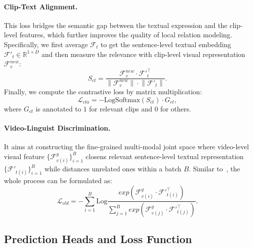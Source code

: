 \paragraph{Clip-Text Alignment.} This loss bridges the semantic gap between the textual expression and the clip-level features, which further improves the quality of local relation modeling. Specifically, we first average $\mathcal{F}_t$ to get the sentence-level textual embedding $\mathcal{F'}_t \in \mathbb{R}^{1 \times D}$ and then measure the relevance with clip-level visual representation $\mathcal{F}_v^{new}$:
\begin{equation}
    S_{ct} = \frac{\mathcal{F}_v^{new}\cdot \mathcal{F'}_t^{\top } }{\left \| \mathcal{F}_v^{new} \right \|\cdot \left \|  \mathcal{F'}_t \right \| }. 
\label{cta}
\end{equation}
Finally, we compute the contrastive loss by matrix multiplication:
\begin{equation}
    \mathcal{L}_{cta} = -\mathrm{LogSoftmax}\left(S_{ct}\right)\cdot G_{ct},
\label{cta_loss}
\end{equation}
where $G_{ct}$ is annotated to $1$ for relevant clips and $0$ for others.
\paragraph{Video-Linguist Discrimination.} It aims at constructing the fine-grained multi-modal joint space where video-level visual feature $\{\mathcal{F}_{v(i)}^g\}_{i=1}^{B}$ closens relevant sentence-level textual representation $\{\mathcal{F'}_{t(i)}\}_{i=1}^{B}$ while distances unrelated ones within a batch $B$.
Similar to~\cite{clip}, the whole process can be formulated as:  
\begin{equation}
    \mathcal{L}_{vld} = -\sum_{i=1}^{B}\mathrm{Log}\frac{exp\left(\mathcal{F}_{v(i)}^g \cdot \mathcal{F'}_{t(i)}^{\top}\right)}{\sum_{j=1}^B exp\left(\mathcal{F}_{v(j)}^g \cdot \mathcal{F'}_{t(j)}^{\top}\right)}.
\end{equation}

\subsection{Prediction Heads and Loss Function}
\label{sec:phlf}
